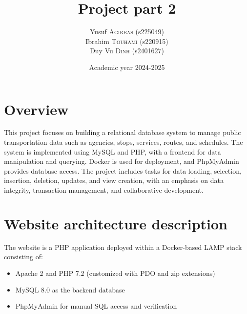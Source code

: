 \documentclass[a4paper, 12pt]{article}
\title{Project part 2}
\author{
Yusuf \textsc{Agirbas} (s225049)\\
Ibrahim \textsc{Touhami} (s220915) \\
Duy Vu \textsc{Dinh} (s2401627)\\
}
\date{Academic year 2024-2025}
\begin{document}


\newpage

\section*{Overview}

This project focuses on building a relational database system to manage public transportation data such as agencies, stops, services, routes, and schedules. The system is implemented using MySQL and PHP, with a frontend for data manipulation and querying. Docker is used for deployment, and PhpMyAdmin provides database access. The project includes tasks for data loading, selection, insertion, deletion, updates, and view creation, with an emphasis on data integrity, transaction management, and collaborative development.


\section{Website architecture description} \label{sec:1}

The website is a PHP application deployed within a Docker-based LAMP stack consisting of:
\begin{itemize}
    \item Apache 2 and PHP 7.2 (customized with PDO and zip extensions)
    \item MySQL 8.0 as the backend database
    \item PhpMyAdmin for manual SQL access and verification
\end{itemize}
\end{document}
